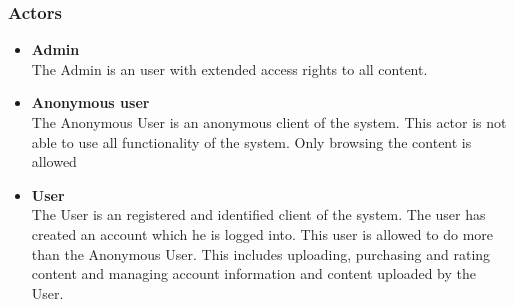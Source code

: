 %

\subsubsection{Actors}
\label{sec:Actors}
\begin{itemize}
\item \textbf{Admin} \\
The Admin is an user with extended access rights to all content. 
\item \textbf{Anonymous user}\\ 
The Anonymous User is an anonymous client of the system. This actor is not able to use all functionality of the system. Only browsing the content is allowed
\item \textbf{User} \\
The User is an registered and identified client of the system. The user has created an account which he is logged into. This user is allowed to do more than the Anonymous User. This includes uploading, purchasing and rating content and managing account information and content uploaded by the User.
\end{itemize}

